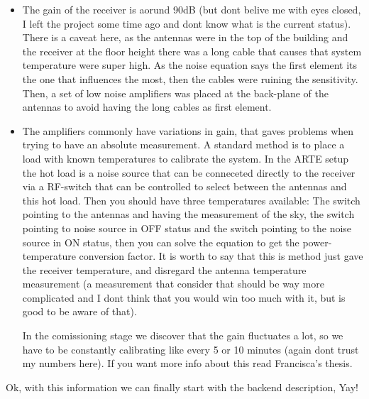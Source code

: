 \begin{itemize}
    \item The gain of the receiver is aorund 90dB (but dont belive me with eyes closed, I left the project some time ago and dont know what is the current status). There is a caveat here, as the antennas were in the top of the building and the receiver at the floor height there was a long cable that causes that system temperature were super high. As the noise equation says the first element its the one that influences the most, then the cables were ruining the sensitivity. Then, a set of low noise amplifiers was placed at the back-plane of the antennas to avoid having the long cables as first element.

    \item The amplifiers commonly have variations in gain, that gaves problems when trying to have an absolute measurement. A standard method is to place a load with known temperatures to calibrate the system. In the ARTE setup the hot load is a noise source that can be conneceted directly to the receiver via  a RF-switch that can be controlled to select between the antennas and this hot load.  Then you should have three temperatures available: The switch pointing to the antennas and having the measurement of the sky, the switch pointing to noise source in OFF status and the switch pointing to the noise source in ON status, then you can solve the equation to get the power-temperature conversion factor.
        It is worth to say that this is method just gave the receiver temperature, and disregard the antenna temperature measurement (a measurement that consider that should be way more complicated and I dont think that you would win too much with it, but is good to be aware of that).

        In the comissioning stage we discover that the gain fluctuates a lot, so we have to be constantly calibrating like every 5 or 10 minutes (again dont trust my numbers here).
    If you want more info about this read Francisca's thesis.
\end{itemize}

Ok, with this information we can finally start with the backend description, Yay!

